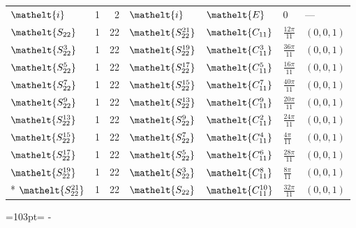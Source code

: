 \documentclass[10pt,a4paper]{article}
\newcommand{\needspace}[1]{\par\penalty-100\begingroup\dimen0=#1\relax\dimen2=\pagegoal
  \advance\dimen2-\pagetotal\ifdim\dimen0>\dimen2\relax\ifdim\dimen2>0pt\vfil\break\fi\fi
  \endgroup}
\numberwithin{equation}{section}
\newcommand{\eltfont}[1]{{\let\sigma\eltsigma\mathelt{#1}}}
\newcommand{\cls}[1]{\eltfont{#1}}
\newcommand{\dirvec}[3]{(#1, #2, #3)}
\begin{document}
{\begin{longtable}{@{}lrrllll@{}}
$\cls{i}$ & 1 & 2 & $\cls{i}$ & $\cls{E}$ & $0$ & ---\\
$\cls{S_{22}}$ & 1 & 22 & $\cls{S_{22}^{21}}$ & $\cls{C_{11}}$ & $\tfrac{12\pi}{11}$ & $\dirvec{0}{0}{1}$\\
$\cls{S_{22}^{3}}$ & 1 & 22 & $\cls{S_{22}^{19}}$ & $\cls{C_{11}^{3}}$ & $\tfrac{36\pi}{11}$ & $\dirvec{0}{0}{1}$\\
$\cls{S_{22}^{5}}$ & 1 & 22 & $\cls{S_{22}^{17}}$ & $\cls{C_{11}^{5}}$ & $\tfrac{16\pi}{11}$ & $\dirvec{0}{0}{1}$\\
$\cls{S_{22}^{7}}$ & 1 & 22 & $\cls{S_{22}^{15}}$ & $\cls{C_{11}^{7}}$ & $\tfrac{40\pi}{11}$ & $\dirvec{0}{0}{1}$\\
$\cls{S_{22}^{9}}$ & 1 & 22 & $\cls{S_{22}^{13}}$ & $\cls{C_{11}^{9}}$ & $\tfrac{20\pi}{11}$ & $\dirvec{0}{0}{1}$\\
$\cls{S_{22}^{13}}$ & 1 & 22 & $\cls{S_{22}^{9}}$ & $\cls{C_{11}^{2}}$ & $\tfrac{24\pi}{11}$ & $\dirvec{0}{0}{1}$\\
$\cls{S_{22}^{15}}$ & 1 & 22 & $\cls{S_{22}^{7}}$ & $\cls{C_{11}^{4}}$ & $\tfrac{4\pi}{11}$ & $\dirvec{0}{0}{1}$\\
$\cls{S_{22}^{17}}$ & 1 & 22 & $\cls{S_{22}^{5}}$ & $\cls{C_{11}^{6}}$ & $\tfrac{28\pi}{11}$ & $\dirvec{0}{0}{1}$\\
$\cls{S_{22}^{19}}$ & 1 & 22 & $\cls{S_{22}^{3}}$ & $\cls{C_{11}^{8}}$ & $\tfrac{8\pi}{11}$ & $\dirvec{0}{0}{1}$\\*
$\cls{S_{22}^{21}}$ & 1 & 22 & $\cls{S_{22}}$ & $\cls{C_{11}^{10}}$ & $\tfrac{32\pi}{11}$ & $\dirvec{0}{0}{1}$\\
\bottomrule\end{longtable}}
\needspace{103pt}
\end{document}
